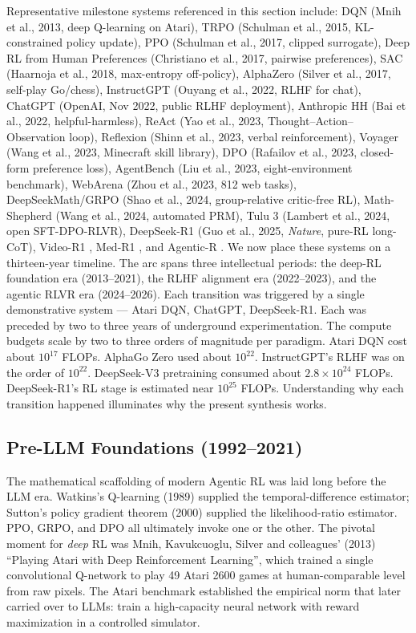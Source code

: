 \documentclass{article}
\begin{document}
Representative milestone systems referenced in this section include: DQN (Mnih et al., 2013, deep Q-learning on Atari), TRPO (Schulman et al., 2015, KL-constrained policy update), PPO (Schulman et al., 2017, clipped surrogate), Deep RL from Human Preferences (Christiano et al., 2017, pairwise preferences), SAC (Haarnoja et al., 2018, max-entropy off-policy), AlphaZero (Silver et al., 2017, self-play Go/chess), InstructGPT (Ouyang et al., 2022, RLHF for chat), ChatGPT (OpenAI, Nov 2022, public RLHF deployment), Anthropic HH (Bai et al., 2022, helpful-harmless), ReAct (Yao et al., 2023, Thought--Action--Observation loop), Reflexion (Shinn et al., 2023, verbal reinforcement), Voyager (Wang et al., 2023, Minecraft skill library), DPO (Rafailov et al., 2023, closed-form preference loss), AgentBench (Liu et al., 2023, eight-environment benchmark), WebArena (Zhou et al., 2023, 812 web tasks), DeepSeekMath/GRPO (Shao et al., 2024, group-relative critic-free RL), Math-Shepherd (Wang et al., 2024, automated PRM), Tulu 3 (Lambert et al., 2024, open SFT-DPO-RLVR), DeepSeek-R1 (Guo et al., 2025, \emph{Nature}, pure-RL long-CoT), Video-R1 \citep{feng20252025}, Med-R1 \citep{lai20262026}, and Agentic-R \citep{liu20262026}. We now place these systems on a thirteen-year timeline. The arc spans three intellectual periods: the deep-RL foundation era (2013--2021), the RLHF alignment era (2022--2023), and the agentic RLVR era (2024--2026). Each transition was triggered by a single demonstrative system --- Atari DQN, ChatGPT, DeepSeek-R1. Each was preceded by two to three years of underground experimentation. The compute budgets scale by two to three orders of magnitude per paradigm. Atari DQN cost about \(10^{17}\) FLOPs. AlphaGo Zero used about \(10^{22}\). InstructGPT's RLHF was on the order of \(10^{22}\). DeepSeek-V3 pretraining consumed about \(2.8 \times 10^{24}\) FLOPs. DeepSeek-R1's RL stage is estimated near \(10^{25}\) FLOPs. Understanding why each transition happened illuminates why the present synthesis works.

\subsection{Pre-LLM Foundations (1992--2021)}\label{pre-llm-foundations-19922021}

The mathematical scaffolding of modern Agentic RL was laid long before the LLM era. Watkins's Q-learning (1989) supplied the temporal-difference estimator; Sutton's policy gradient theorem (2000) supplied the likelihood-ratio estimator. PPO, GRPO, and DPO all ultimately invoke one or the other. The pivotal moment for \emph{deep} RL was Mnih, Kavukcuoglu, Silver and colleagues' (2013) ``Playing Atari with Deep Reinforcement Learning'', which trained a single convolutional Q-network to play 49 Atari 2600 games at human-comparable level from raw pixels. The Atari benchmark established the empirical norm that later carried over to LLMs: train a high-capacity neural network with reward maximization in a controlled simulator.
\end{document}
